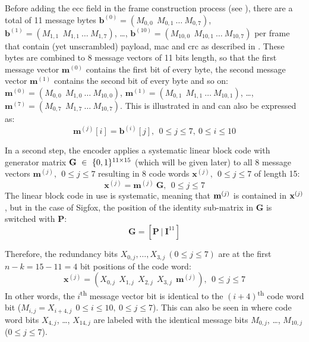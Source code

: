 Before adding the \gls{ecc} field in the frame construction process (see ), there are a total of 11 message bytes $\mathbf b^{(0)} = (M_{0, 0} ~~ M_{0, 1} ~ \dots ~ M_{0, 7})$, $\mathbf b^{(1)} = (M_{1, 1} ~~ M_{1, 1} ~ \dots ~ M_{1, 7})$, \ldots, $\mathbf b^{(10)} = (M_{10, 0} ~~ M_{10, 1} ~ \dots ~ M_{10, 7})$ per frame that contain (yet unscrambled) payload, \gls{mac} and \gls{crc} as described in .
These bytes are combined to 8 message vectors of 11 bits length, so that the first message vector $\mathbf m^{(0)}$ contains the first bit of every byte, the second message vector $\mathbf m^{(1)}$ contains the second bit of every byte and so on:
$\mathbf m^{(0)} = (M_{0, 0} ~~ M_{1, 0} ~ \dots ~ M_{10, 0})$, $\mathbf m^{(1)} = (M_{0, 1} ~~ M_{1, 1} ~ \dots ~ M_{10, 1})$, \ldots, $\mathbf m^{(7)} = (M_{0, 7} ~~ M_{1, 7} ~ \dots ~ M_{10, 7})$.
This is illustrated in  and can also be expressed as:
\begin{equation}
	\mathbf m^{(j)}[i] = \mathbf b^{(i)}[j], ~~ 0 \leq j \leq 7, ~ 0 \leq i \leq 10
\end{equation}

In a second step, the encoder applies a systematic linear block code with generator matrix $\textbf G ~ \in ~ \{0, 1\}^{11 \times 15}$ (which will be given later) to all 8 message vectors $\mathbf m^{(j)}, ~~ 0 \leq j \leq 7$ resulting in 8 code words $\mathbf x^{(j)}, ~~ 0 \leq j \leq 7$ of length 15:
\begin{equation}
	\mathbf x^{(j)} = \mathbf m^{(j)} ~ \mathbf G, ~~ 0 \leq j \leq 7
\end{equation}
The linear block code in use is systematic, meaning that $\textbf m^{(j)}$ is contained in $\textbf x^{(j)}$, but in the case of Sigfox, the position of the identity sub-matrix in $\mathbf G$ is switched with $\mathbf P$:
\begin{equation}
	\mathbf G = \left[ \mathbf P ~ | ~ \mathbf I^{11} \right]
\end{equation}

Therefore, the redundancy bits $X_{0, j}, \ldots, X_{3, j} ~ (0 \leq j \leq 7)$ are at the first $n - k = 15 - 11 = 4$ bit positions of the code word:
\begin{equation}
	\mathbf x^{(j)} = \left( X_{0, j} ~~ X_{1, j} ~~ X_{2, j} ~~ X_{3, j} ~~ \mathbf m^{(j)} \right), ~~ 0 \leq j \leq 7
\end{equation}
In other words, the $i$\textsuperscript{th} message vector bit is identical to the $(i + 4)$\textsuperscript{th} code word bit ($M_{i, j} = X_{i + 4, j} ~~ 0 \leq i \leq 10, ~ 0 \leq j \leq 7$).
This can also be seen in  where code word bits $X_{4, j}$, \ldots, $X_{14, j}$ are labeled with the identical message bits $M_{0, j}$, \ldots, $M_{10, j}$ ($0 \leq j \leq 7$).

